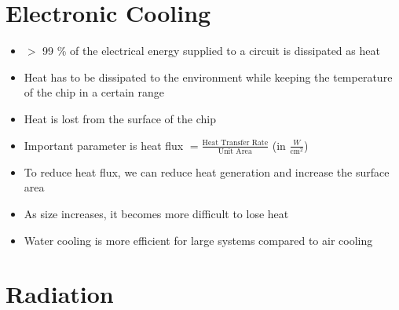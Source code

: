 \documentclass[12pt]{article}
\begin{document}
\section {Electronic Cooling}


\begin{itemize}
    \item $>$ 99 \% of the electrical energy supplied to a circuit is dissipated as heat
    \item Heat has to be dissipated to the environment while keeping the temperature of the chip in a certain range
    \item Heat is lost from the surface of the chip
    \item Important parameter is heat flux $ = \frac{\text{Heat Transfer Rate}}{\text{Unit Area}}$ (in $\frac{W}{\mathrm{cm}^2}$)
    \item To reduce heat flux, we can reduce heat generation and increase the surface area 
    \item As size increases, it becomes more difficult to lose heat
    \item Water cooling is more efficient for large systems compared to air cooling
\end{itemize}


\section{Radiation}
\end{document}
